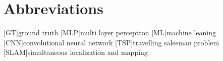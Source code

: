 \chapter{Abbreviations}

\begin{acronym}[AAPC]
	[GT]{ground truth}
	[MLP]{multi layer perceptron}
	[ML]{machine leaning}
	[CNN]{convolutional neural network}
	[TSP]{travelling salesman problem}
	[SLAM]{simultaneous localization and mapping}
\end{acronym}